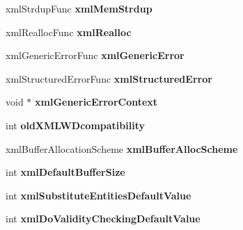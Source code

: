 \begin{DoxyCompactItemize}
\item 
\hypertarget{struct__xmlGlobalState_a480efe13ea3f6855bae2e9a9f7f3a0c2}{
xmlStrdupFunc {\bfseries xmlMemStrdup}}
\label{struct__xmlGlobalState_a480efe13ea3f6855bae2e9a9f7f3a0c2}

\item 
\hypertarget{struct__xmlGlobalState_afe3342331af0b0563377a7967ba2fa68}{
xmlReallocFunc {\bfseries xmlRealloc}}
\label{struct__xmlGlobalState_afe3342331af0b0563377a7967ba2fa68}

\item 
\hypertarget{struct__xmlGlobalState_a68fec3bbfc35f99f7bff04373dbf90c2}{
xmlGenericErrorFunc {\bfseries xmlGenericError}}
\label{struct__xmlGlobalState_a68fec3bbfc35f99f7bff04373dbf90c2}

\item 
\hypertarget{struct__xmlGlobalState_aef0f8aae9672650f571ccfdb5fe893a1}{
xmlStructuredErrorFunc {\bfseries xmlStructuredError}}
\label{struct__xmlGlobalState_aef0f8aae9672650f571ccfdb5fe893a1}

\item 
\hypertarget{struct__xmlGlobalState_a34d13a95a10b324c97ee524fb25ac0bd}{
void $\ast$ {\bfseries xmlGenericErrorContext}}
\label{struct__xmlGlobalState_a34d13a95a10b324c97ee524fb25ac0bd}

\item 
\hypertarget{struct__xmlGlobalState_a3a4587d5954d544f4ca2234374d3bcd9}{
int {\bfseries oldXMLWDcompatibility}}
\label{struct__xmlGlobalState_a3a4587d5954d544f4ca2234374d3bcd9}

\item 
\hypertarget{struct__xmlGlobalState_a4da43ce871efefda1a35b93cf442c553}{
xmlBufferAllocationScheme {\bfseries xmlBufferAllocScheme}}
\label{struct__xmlGlobalState_a4da43ce871efefda1a35b93cf442c553}

\item 
\hypertarget{struct__xmlGlobalState_abb8a2b0c3484e57154ff709c7c8dc94b}{
int {\bfseries xmlDefaultBufferSize}}
\label{struct__xmlGlobalState_abb8a2b0c3484e57154ff709c7c8dc94b}

\item 
\hypertarget{struct__xmlGlobalState_a1a0fd78aa36e227f429299a808ea8bee}{
int {\bfseries xmlSubstituteEntitiesDefaultValue}}
\label{struct__xmlGlobalState_a1a0fd78aa36e227f429299a808ea8bee}

\item 
\hypertarget{struct__xmlGlobalState_ab94304dcd880b0c6f68634fe7fcc60ef}{
int {\bfseries xmlDoValidityCheckingDefaultValue}}
\label{struct__xmlGlobalState_ab94304dcd880b0c6f68634fe7fcc60ef}


\end{DoxyCompactItemize}
